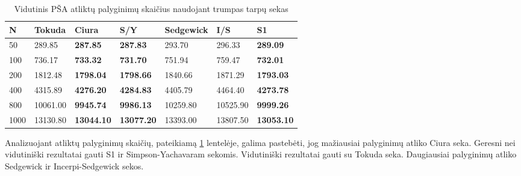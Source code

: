 \documentclass{VUMIFInfKursinis}
\begin{document}
\begin{table}[H]
  \caption{Vidutinis PŠA atliktų palyginimų skaičius naudojant trumpas tarpų sekas}
  \label{iss_small_comparisons}
  \begin{tabular}{|l|l|l|l|l|l|l|}
  \hline
  N    & Tokuda   & Ciura             & S/Y               & Sedgewick & I/S      & S1                \\ \hline
  50   & 289.85   & \textbf{287.85}   & \textbf{287.83}   & 293.70    & 296.33   & \textbf{289.09}   \\ \hline
  100  & 736.17   & \textbf{733.32}   & \textbf{731.70}   & 751.94    & 759.47   & \textbf{732.01}   \\ \hline
  200  & 1812.48  & \textbf{1798.04}  & \textbf{1798.66}  & 1840.66   & 1871.29  & \textbf{1793.03}  \\ \hline
  400  & 4315.89  & \textbf{4276.20}  & \textbf{4284.83}  & 4405.79   & 4464.40  & \textbf{4273.78}  \\ \hline
  800  & 10061.00 & \textbf{9945.74}  & \textbf{9986.13}  & 10259.80  & 10525.90 & \textbf{9999.26}  \\ \hline
  1000 & 13130.80 & \textbf{13044.10} & \textbf{13077.20} & 13393.00  & 13807.50 & \textbf{13053.10} \\ \hline
  \end{tabular}
\end{table}

Analizuojant atliktų palyginimų skaičių, pateikiamą \ref{iss_small_comparisons} lentelėje,
galima pastebėti, jog mažiausiai palyginimų atliko Ciura seka.
Geresni nei vidutiniški rezultatai gauti S1 ir Simpson-Yachavaram sekomis.
Vidutiniški rezultatai gauti su Tokuda seka.
Daugiausiai palyginimų atliko Sedgewick ir Incerpi-Sedgewick sekos.
\end{document}
